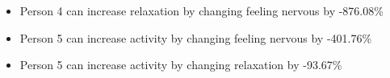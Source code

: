 \begin{itemize}\item Person 4 can increase relaxation by changing feeling nervous  by -876.08\%\item Person 5 can increase activity by changing feeling nervous by -401.76\%\item Person 5 can increase activity by changing relaxation by -93.67\%\end{itemize}